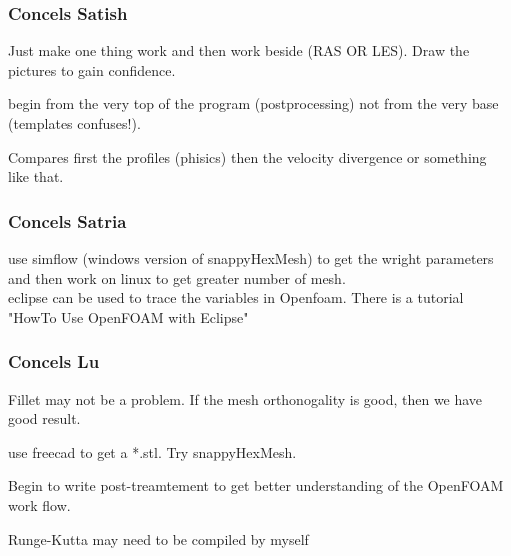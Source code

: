 \documentclass{beamer}
\begin{document}

\begin{frame}
\frametitle{Concels Satish}

Just make one thing work and then work beside (RAS OR LES).
Draw the pictures to gain confidence.

begin from the very top of the program (postprocessing) not from the very base (templates confuses!).

Compares first the profiles (phisics) then the velocity divergence or something like that.

\end{frame}


\begin{frame}
\frametitle{Concels Satria}

use simflow (windows version of snappyHexMesh) to get the wright parameters and then work on linux to get greater number of mesh. \\

eclipse can be used to trace the variables in Openfoam. There is a tutorial "HowTo Use OpenFOAM with Eclipse"

\end{frame}


\begin{frame}
\frametitle{Concels Lu}

Fillet may not be a problem. If the mesh orthonogality is good, then we have good result.

use freecad to get a *.stl. Try snappyHexMesh.

Begin to write post-treamtement to get better understanding of the OpenFOAM work flow.

Runge-Kutta may need to be compiled by myself

\end{frame}
\end{document}
